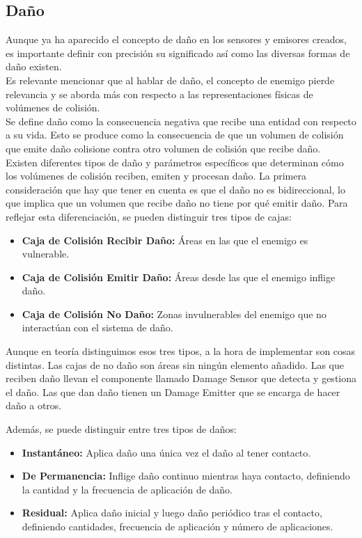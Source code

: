 \subsection{Daño}
Aunque ya ha aparecido el concepto de daño en los sensores y emisores creados, es importante definir con precisión su significado así como las diversas formas de daño existen. \\
Es relevante mencionar que al hablar de daño, el concepto de enemigo pierde relevancia y se aborda más con respecto a las representaciones físicas de volúmenes de colisión.\\
Se define daño como la consecuencia negativa que recibe una entidad con respecto a su vida. Esto se produce como la consecuencia de que un volumen de colisión que emite daño colisione contra otro volumen de colisión que recibe daño.\\
Existen diferentes tipos de daño y parámetros específicos que determinan cómo los volúmenes de colisión reciben, emiten y procesan daño.
La primera consideración que hay que tener en cuenta es que el daño no es bidireccional, lo que implica que un volumen que recibe daño no tiene por qué emitir daño. Para reflejar esta diferenciación, se pueden distinguir tres tipos de cajas:
\begin{itemize}
	 \item \textbf{Caja de Colisión Recibir Daño:} Áreas en las que el enemigo es vulnerable.
	 \item \textbf{Caja de Colisión Emitir Daño:} Áreas desde las que el enemigo inflige daño.
	 \item  \textbf{Caja de Colisión No Daño:} Zonas invulnerables del enemigo que no interactúan con el sistema de daño.
\end{itemize}
Aunque en teoría distinguimos esos tres tipos, a la hora de implementar son cosas distintas. Las cajas de no daño son áreas sin ningún elemento añadido. Las que reciben daño llevan el componente llamado Damage Sensor que detecta y gestiona el daño. Las que dan daño tienen un Damage Emitter que se encarga de hacer daño a otros.

Además, se puede distinguir entre tres tipos de daños:
\begin{itemize}
    \item \textbf{Instantáneo:} Aplica daño una única vez el daño al tener contacto.
    \item \textbf{De Permanencia:} Inflige daño continuo mientras haya contacto, definiendo la cantidad y la frecuencia de aplicación de daño.
    \item \textbf{Residual:} Aplica daño inicial y luego daño periódico tras el contacto, definiendo cantidades, frecuencia de aplicación y número de aplicaciones.
\end{itemize}

